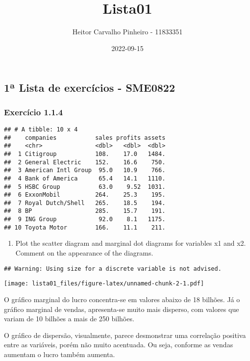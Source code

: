 \documentclass[
]{article}
\title{Lista01}
\author{Heitor Carvalho Pinheiro - 11833351}
\date{2022-09-15}
\providecommand{\tightlist}{%
  \setlength{\itemsep}{0pt}\setlength{\parskip}{0pt}}
\begin{document}
\maketitle

\hypertarget{uxaa-lista-de-exercuxedcios---sme0822}{%
\subsection{1ª Lista de exercícios -
SME0822}\label{uxaa-lista-de-exercuxedcios---sme0822}}

\hypertarget{exercuxedcio-1.1.4}{%
\subsubsection{Exercício 1.1.4}\label{exercuxedcio-1.1.4}}

\begin{verbatim}
## # A tibble: 10 x 4
##    companies           sales profits assets
##    <chr>               <dbl>   <dbl>  <dbl>
##  1 Citigroup           108.    17.0   1484.
##  2 General Electric    152.    16.6    750.
##  3 American Intl Group  95.0   10.9    766.
##  4 Bank of America      65.4   14.1   1110.
##  5 HSBC Group           63.0    9.52  1031.
##  6 ExxonMobil          264.    25.3    195.
##  7 Royal Dutch/Shell   265.    18.5    194.
##  8 BP                  285.    15.7    191.
##  9 ING Group            92.0    8.1   1175.
## 10 Toyota Motor        166.    11.1    211.
\end{verbatim}

\begin{enumerate}
\def\labelenumi{\alph{enumi})}
\tightlist
\item
  Plot the scatter diagram and marginal dot diagrams for variables x1
  and x2. Comment on the appearance of the diagrams.
\end{enumerate}

\begin{verbatim}
## Warning: Using size for a discrete variable is not advised.
\end{verbatim}

\texttt{[image: lista01\_files/figure-latex/unnamed-chunk-2-1.pdf]}

O gráfico marginal do lucro concentra-se em valores abaixo de 18
bilhões. Já o gráfico marginal de vendas, apresenta-se muito mais
disperso, com valores que variam de 10 bilhões a mais de 250 bilhões.

O gráfico de dispersão, visualmente, parece desmonstrar uma correlação
positiva entre as variáveis, porém não muito acentuada. Ou seja,
conforme as vendas aumentam o lucro também aumenta.
\end{document}
